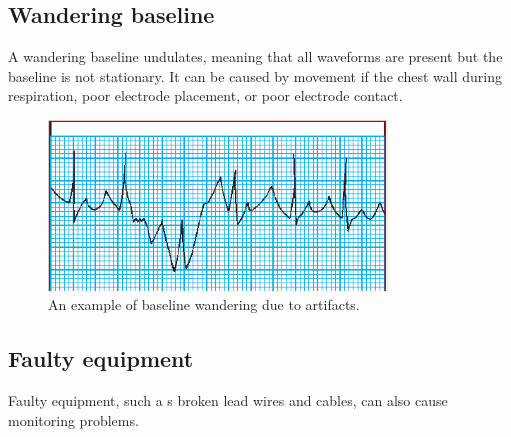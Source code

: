 \subsection{Wandering baseline}
A wandering baseline undulates, meaning that all waveforms are present but the baseline is not stationary.  It can be caused by movement if the chest wall during respiration, poor electrode placement, or poor electrode contact.
\begin{figure}[ht!]
	\centering
	\includegraphics[width=90mm]{figures/ch2/11.png}
	\caption{An example of baseline wandering due to artifacts.}
	\label{fig2.11}
\end{figure}

\subsection{Faulty equipment}
Faulty equipment, such a s broken lead wires and cables, can also cause monitoring problems.